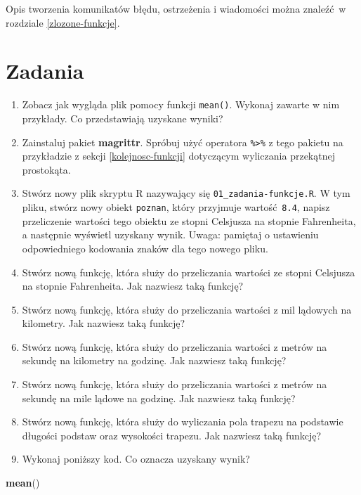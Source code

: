 \documentclass[paper=6in:9in,pagesize=pdftex,headinclude=on,footinclude=on,10pt]{scrbook}
\newenvironment{Shaded}{\begin{snugshade}}{\end{snugshade}}
\newcommand{\KeywordTok}[1]{\textcolor[rgb]{0.13,0.29,0.53}{\textbf{#1}}}
\newcommand{\NormalTok}[1]{#1}
\providecommand{\tightlist}{%
  \setlength{\itemsep}{0pt}\setlength{\parskip}{0pt}}
\begin{document}
Opis tworzenia komunikatów błędu, ostrzeżenia i wiadomości można znaleźć~w rozdziale \ref{zlozone-funkcje}.

\hypertarget{zadania-2}{%
\section{Zadania}\label{zadania-2}}

\begin{enumerate}
\def\labelenumi{\arabic{enumi})}
\tightlist
\item
  Zobacz jak wygląda plik pomocy funkcji \texttt{mean()}.
  Wykonaj zawarte w nim przykłady.
  Co przedstawiają uzyskane wyniki?
\item
  Zainstaluj pakiet \textbf{magrittr}.
  Spróbuj użyć operatora \texttt{\%\textgreater{}\%} z tego pakietu na przykładzie z sekcji \ref{kolejnosc-funkcji} dotyczącym wyliczania przekątnej prostokąta.
\item
  Stwórz nowy plik skryptu R nazywający się \texttt{01\_zadania-funkcje.R}.
  W tym pliku, stwórz nowy obiekt \texttt{poznan}, który przyjmuje wartość~\texttt{8.4}, napisz przeliczenie wartości tego obiektu ze stopni Celsjusza na stopnie Fahrenheita, a następnie wyświetl uzyskany wynik.
  Uwaga: pamiętaj o ustawieniu odpowiedniego kodowania znaków dla tego nowego pliku.
\item
  Stwórz nową funkcję, która służy do przeliczania wartości ze stopni Celsjusza na stopnie Fahrenheita.
  Jak nazwiesz taką funkcję?
\item
  Stwórz nową funkcję, która służy do przeliczania wartości z mil lądowych na kilometry.
  Jak nazwiesz taką funkcję?
\item
  Stwórz nową funkcję, która służy do przeliczania wartości z metrów na sekundę na kilometry na godzinę.
  Jak nazwiesz taką funkcję?
\item
  Stwórz nową funkcję, która służy do przeliczania wartości z metrów na sekundę na mile lądowe na godzinę.
  Jak nazwiesz taką funkcję?
\item
  Stwórz nową funkcję, która służy do wyliczania pola trapezu na podstawie długości podstaw oraz wysokości trapezu.
  Jak nazwiesz taką funkcję?
\item
  Wykonaj poniższy kod.
  Co oznacza uzyskany wynik?
\end{enumerate}

\begin{Shaded}
\begin{Highlighting}[]
\KeywordTok{mean}\NormalTok{()}
\end{Highlighting}
\end{Shaded}
\end{document}
